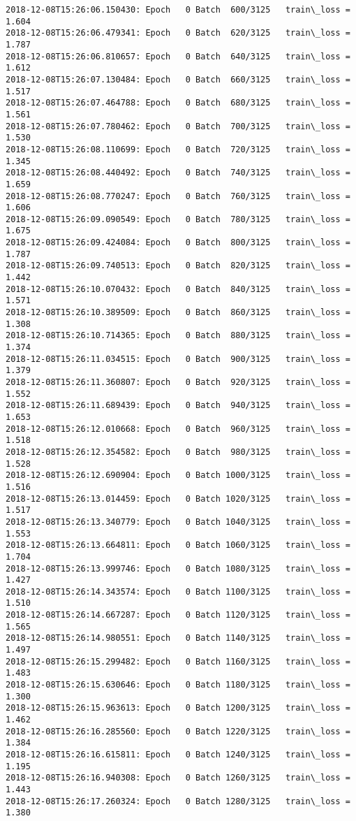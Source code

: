 \documentclass[11pt]{article}
\begin{document}
\begin{Verbatim}[commandchars=\\\{\}]
2018-12-08T15:26:06.150430: Epoch   0 Batch  600/3125   train\_loss = 1.604
2018-12-08T15:26:06.479341: Epoch   0 Batch  620/3125   train\_loss = 1.787
2018-12-08T15:26:06.810657: Epoch   0 Batch  640/3125   train\_loss = 1.612
2018-12-08T15:26:07.130484: Epoch   0 Batch  660/3125   train\_loss = 1.517
2018-12-08T15:26:07.464788: Epoch   0 Batch  680/3125   train\_loss = 1.561
2018-12-08T15:26:07.780462: Epoch   0 Batch  700/3125   train\_loss = 1.530
2018-12-08T15:26:08.110699: Epoch   0 Batch  720/3125   train\_loss = 1.345
2018-12-08T15:26:08.440492: Epoch   0 Batch  740/3125   train\_loss = 1.659
2018-12-08T15:26:08.770247: Epoch   0 Batch  760/3125   train\_loss = 1.606
2018-12-08T15:26:09.090549: Epoch   0 Batch  780/3125   train\_loss = 1.675
2018-12-08T15:26:09.424084: Epoch   0 Batch  800/3125   train\_loss = 1.787
2018-12-08T15:26:09.740513: Epoch   0 Batch  820/3125   train\_loss = 1.442
2018-12-08T15:26:10.070432: Epoch   0 Batch  840/3125   train\_loss = 1.571
2018-12-08T15:26:10.389509: Epoch   0 Batch  860/3125   train\_loss = 1.308
2018-12-08T15:26:10.714365: Epoch   0 Batch  880/3125   train\_loss = 1.374
2018-12-08T15:26:11.034515: Epoch   0 Batch  900/3125   train\_loss = 1.379
2018-12-08T15:26:11.360807: Epoch   0 Batch  920/3125   train\_loss = 1.552
2018-12-08T15:26:11.689439: Epoch   0 Batch  940/3125   train\_loss = 1.653
2018-12-08T15:26:12.010668: Epoch   0 Batch  960/3125   train\_loss = 1.518
2018-12-08T15:26:12.354582: Epoch   0 Batch  980/3125   train\_loss = 1.528
2018-12-08T15:26:12.690904: Epoch   0 Batch 1000/3125   train\_loss = 1.516
2018-12-08T15:26:13.014459: Epoch   0 Batch 1020/3125   train\_loss = 1.517
2018-12-08T15:26:13.340779: Epoch   0 Batch 1040/3125   train\_loss = 1.553
2018-12-08T15:26:13.664811: Epoch   0 Batch 1060/3125   train\_loss = 1.704
2018-12-08T15:26:13.999746: Epoch   0 Batch 1080/3125   train\_loss = 1.427
2018-12-08T15:26:14.343574: Epoch   0 Batch 1100/3125   train\_loss = 1.510
2018-12-08T15:26:14.667287: Epoch   0 Batch 1120/3125   train\_loss = 1.565
2018-12-08T15:26:14.980551: Epoch   0 Batch 1140/3125   train\_loss = 1.497
2018-12-08T15:26:15.299482: Epoch   0 Batch 1160/3125   train\_loss = 1.483
2018-12-08T15:26:15.630646: Epoch   0 Batch 1180/3125   train\_loss = 1.300
2018-12-08T15:26:15.963613: Epoch   0 Batch 1200/3125   train\_loss = 1.462
2018-12-08T15:26:16.285560: Epoch   0 Batch 1220/3125   train\_loss = 1.384
2018-12-08T15:26:16.615811: Epoch   0 Batch 1240/3125   train\_loss = 1.195
2018-12-08T15:26:16.940308: Epoch   0 Batch 1260/3125   train\_loss = 1.443
2018-12-08T15:26:17.260324: Epoch   0 Batch 1280/3125   train\_loss = 1.380

\end{Verbatim}
\end{document}
